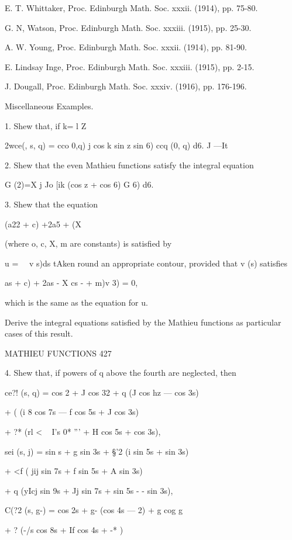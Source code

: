 {{E. T. Whittaker, Proc. Edinburgh Math. Soc. xxxii. (1914), pp. 75-80. 

G. N, Watson, Proc. Edinburgh Math. Soc. xxxiii. (1915), pp. 25-30. 

A. W. Young, Proc. Edinburgh Math. Soc. xxxii. (1914), pp. 81-90. 

E. Lindsay Inge, Proc. Edinburgh Math. Soc. xxxiii. (1915), pp. 2-15. 

J. Dougall, Proc. Edinburgh Math. Soc. xxxiv. (1916), pp. 176-196. 

Miscellaneous Examples. 

1. Shew that, if k= l Z \ 

2wce(,  s, q) = cco  0,q) j cos  k sin z sin 6) ccq (0, q) d6. 
J —It 

2. Shew that the even Mathieu functions satisfy the integral equation 

G (2)=X j Jo [ik (cos z + cos 6)  G  6) d6. 

3. Shew that the equation 

(a22 + c) +2a5  + (X%

(where o, c, X, m are constants) is satisfied by 

u = \ \   v s)ds 
tAken round an appropriate contour, provided that v (s) satisfies 

 as  + c)  + 2as -  X cs - + m)v  3) = 0, 

which is the same as the equation for u. 

Derive the integral equations satisfied by the Mathieu functions as particular cases of 
this result. 



MATHIEU FUNCTIONS 427 

4. Shew that, if powers of q above the fourth are neglected, then 

ce?! (s, q) = cos 2 + J cos 32 + q  (J cos hz — cos 3s) 

+ (  (i 8 cos 7s — f cos 5s + J cos 3s) 

+ ?* (rl  <    ~ I's  0*  '''  + H cos 5s +   cos 3s), 

sei (s, j) = sin s + g sin 3s + §'2 (i sin 5s + sin 3s) 

+ <f ( jij sin 7s + f sin 5s + A sin 3s) 

+ q  (yIcj sin 9s + Jj sin 7s +   sin 5s -  - sin 3s), 

C(?2 (s, g-) = cos 2s + g- (cos 4s — 2) +   g  cog g  

+ ?  (-/s cos 8s + If cos 4s + -* ) 

}}

